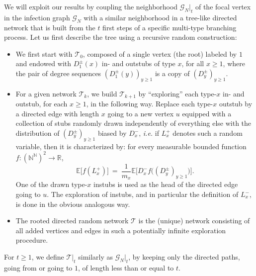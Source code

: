 \begin{refsegment}
We will exploit our results by coupling the neighborhood
$\mathcal{G}_N|_{t}$ of the focal vertex in the infection graph
$\mathcal{G}_N$ with a similar neighborhood in a tree-like directed
network that is built from the $t$ first steps of a specific
multi-type branching process. Let us first describe the tree using a
recursive random construction:
\begin{itemize}
\item We first start with $\mathcal{T}_0$, composed of a single vertex
  (the root) labeled by $1$ and endowed with $D_1^\pm(x)$ in- and
  outstubs of type $x$, for all $x\geq 1$, where the pair of degree sequences
  $(D_1^{\pm}(y))_{y\geq 1}$ is a copy of $(D^\pm_y)_{y\geq 1}$.
\item For a given network $\mathcal{T}_k$, we build
  $\mathcal{T}_{k+1}$ by ``exploring'' each type-$x$ in- and outstub,
  for each $x\geq 1$, in the following way. Replace each type-$x$
  outstub by a directed edge with length $x$ going to a new vertex $u$
  equipped with a collection of stubs randomly drawn independently
  of everything else with the distribution of $(D^\pm_y)_{y\geq 1}$
  biased by $D_x^-$, \textit{i.e.} if $L^{+}_x$ denotes such a random
  variable, then it is characterized by: for every measurable bounded
  function $f:(\mathbb{N}^{\mathbb{N}})^2 \to \mathbb{R}$,
\begin{equation}\label{eq:offspring_distrib}
  \mathbb{E}\big[f(L_x^{+})\big]\ =\
  \frac{1}{m_x}\mathbb{E}\big[D^-_xf\big((D^{\pm}_y)_{y\geq 1}\big)\big].
\end{equation}
One of the drawn type-$x$ instubs is used as the head of the directed
edge going to $u$. The exploration of instubs, and in particular the
definition of $L^-_x$, is done in the obvious analogous way.
\item The rooted directed random network $\mathcal{T}$ is the (unique)
  network consisting of all added vertices and edges in such a
  potentially infinite exploration procedure.
\end{itemize}
For $t\geq 1$, we define $\mathcal{T}|_t$ similarly as
$\mathcal{G}_N|_t$, by keeping only the directed paths, going from or
going to $1$, of length less than or equal to $t$.


\end{refsegment}
